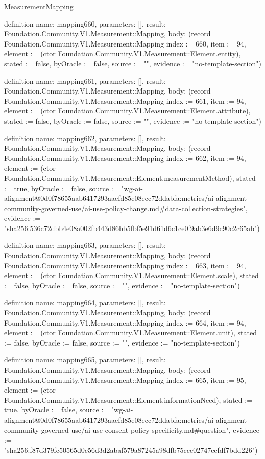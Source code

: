 \begin{lexlean}{MeasurementMapping}
\begin{semanticmodule}
definition{
  name: mapping660,
  parameters: [],
  result: Foundation.Community.V1.Measurement::Mapping,
  body: (record Foundation.Community.V1.Measurement::Mapping {index := 660, item := 94, element := (ctor Foundation.Community.V1.Measurement::Element.entity), stated := false, byOracle := false, source := "", evidence := "no-template-section"})
}

definition{
  name: mapping661,
  parameters: [],
  result: Foundation.Community.V1.Measurement::Mapping,
  body: (record Foundation.Community.V1.Measurement::Mapping {index := 661, item := 94, element := (ctor Foundation.Community.V1.Measurement::Element.attribute), stated := false, byOracle := false, source := "", evidence := "no-template-section"})
}

definition{
  name: mapping662,
  parameters: [],
  result: Foundation.Community.V1.Measurement::Mapping,
  body: (record Foundation.Community.V1.Measurement::Mapping {index := 662, item := 94, element := (ctor Foundation.Community.V1.Measurement::Element.measurementMethod), stated := true, byOracle := false, source := "wg-ai-alignment@0d0f78655aab6417293aaefd85e08ecc72ddabfa:metrics/ai-alignment-community-governed-use/ai-use-policy-change.md#data-collection-strategies", evidence := "sha256:536c72dbb4e08a002fb443d86bb5fbf5e91d61d6c1ce0f9ab3e6d9c90c2c65ab"})
}

definition{
  name: mapping663,
  parameters: [],
  result: Foundation.Community.V1.Measurement::Mapping,
  body: (record Foundation.Community.V1.Measurement::Mapping {index := 663, item := 94, element := (ctor Foundation.Community.V1.Measurement::Element.scale), stated := false, byOracle := false, source := "", evidence := "no-template-section"})
}

definition{
  name: mapping664,
  parameters: [],
  result: Foundation.Community.V1.Measurement::Mapping,
  body: (record Foundation.Community.V1.Measurement::Mapping {index := 664, item := 94, element := (ctor Foundation.Community.V1.Measurement::Element.unit), stated := false, byOracle := false, source := "", evidence := "no-template-section"})
}

definition{
  name: mapping665,
  parameters: [],
  result: Foundation.Community.V1.Measurement::Mapping,
  body: (record Foundation.Community.V1.Measurement::Mapping {index := 665, item := 95, element := (ctor Foundation.Community.V1.Measurement::Element.informationNeed), stated := true, byOracle := false, source := "wg-ai-alignment@0d0f78655aab6417293aaefd85e08ecc72ddabfa:metrics/ai-alignment-community-governed-use/ai-use-consent-policy-specificity.md#question", evidence := "sha256:f87d379fc50565d0c56d3d2abaf579a87245a98dfb75cce02747ecfdf7bdd226"})
}


\end{semanticmodule}
\end{lexlean}
